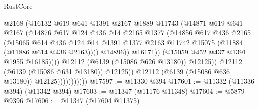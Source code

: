 \begin{lexlean}{RustCore}
\begin{coremodule}
                                          @2168
                                          (@16132
                                            @619
                                            @641
                                            @1391
                                            @2167
                                            @1889
                                            @11743
                                            (@14871
                                              @619
                                              @641
                                              @2167
                                              (@14876
                                                @617
                                                @124
                                                @436
                                                @14
                                                @2165
                                                @1377
                                                (@14856
                                                  @617
                                                  @436
                                                  @2165
                                                  (@15065
                                                    @614
                                                    @436
                                                    @124
                                                    @14
                                                    @1391
                                                    @1377
                                                    @2163
                                                    @11742
                                                    @15075
                                                    (@11884 (@11886 @614 @436 @2163))))
                                                @14896))
                                            @16171))
                                        (@15059 @452 @437 @1391 @1955 @16185))))
                                  @12112
                                  (@6139 (@15086 @626 @13180))
                                  @12125))
                              @12112
                              (@6139 (@15086 @631 @13180))
                              @12125))
                          @12112
                          (@6139 (@15086 @636 @13180))
                          @12125)))))))))))
@17597 := @11330 @394
@17601 := @11332 (@11336 @394) (@11342 @394)
@17603 := @11347 (@11176 @11348)
@17604 := @5879 @9396
@17606 := @11347 (@17604 @11375)

\end{coremodule}
\end{lexlean}
